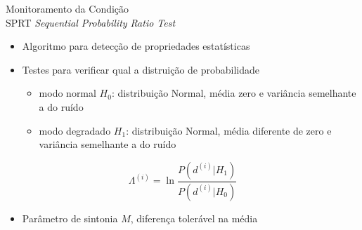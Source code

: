 \documentclass{beamer}
\begin{document}
\begin{frame}{Monitoramento da Condição\\SPRT}
    \textit{Sequential Probability Ratio Test}
    
    \begin{itemize}
        \item Algoritmo para detecção de propriedades estatísticas
        \item Testes para verificar qual a distruição de probabilidade
            \begin{itemize}
                \item modo normal $H_0$: distribuição Normal, média zero e variância
                    semelhante a do ruído
                \item modo degradado $H_1$: distribuição Normal, média diferente de zero e
                    variância semelhante a do ruído
            \end{itemize}
    \end{itemize}
    $$
    \Lambda^{(i)} = \ln \frac{P(d^{(i)} | H_1)}{P(d^{(i)} | H_0)}
    \label{eq:loglikelihood}
    $$
    \begin{itemize}
        \item Parâmetro de sintonia $M$, diferença tolerável na média
    \end{itemize}

\end{frame}

% 
% 
% 
% 
% 
%     
\end{document}

